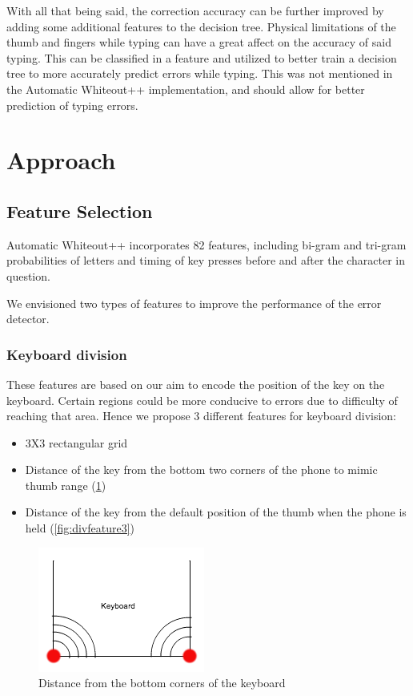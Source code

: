 \documentclass[letterpaper, 10 pt, conference]{ieeeconf}  %
\begin{document}
With all that being said, the correction accuracy can be further improved by adding some additional features to the decision tree.  Physical limitations of the thumb and fingers while typing can have a great affect on the accuracy of said typing.  This can be classified in a feature and utilized to better train a decision tree to more accurately predict errors while typing.  This was not mentioned in the Automatic Whiteout++ implementation, and should allow for better prediction of typing errors.

\section{Approach}

\subsection{Feature Selection}

Automatic Whiteout++ incorporates 82 features, including bi-gram and tri-gram probabilities of letters and timing of key presses before and after the character in question.

We envisioned two types of features to improve the performance of the error detector.

\subsubsection{Keyboard division}

These features are based on our aim to encode the position of the key on the keyboard. Certain regions could be more conducive to errors due to difficulty of reaching that area. Hence we propose 3 different features for keyboard division:
\begin{itemize}
\item 3X3 rectangular grid
\item Distance of the key from the bottom two corners of the phone to mimic thumb range (\ref{fig:divfeature2})
\item Distance of the key from the default position of the thumb when the phone is held (\ref{fig:divfeature3})
\end{itemize}

\begin{figure}[!h]
    \centering
    \includegraphics[scale=0.5]{heuristic2.png}
    \caption{Distance from the bottom corners of the keyboard}
    \label{fig:divfeature2}
\end{figure}
\end{document}
